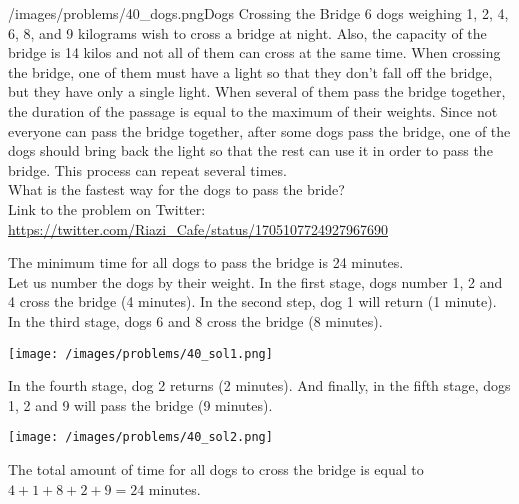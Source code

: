 \begin{problem}{/images/problems/40_dogs.png}{Dogs Crossing the Bridge}
	6 dogs weighing 1, 2, 4, 6, 8, and 9 kilograms wish to cross a bridge at night. Also, the capacity of the bridge is 14 kilos and not all of them can cross at the same time. When crossing the bridge, one of them must have a light so that they don't fall off the bridge, but they have only a single light. When several of them pass the bridge together, the duration of the passage is equal to the maximum of their weights. Since not everyone can pass the bridge together, after some  dogs pass the bridge, one of the dogs should bring back the light so that the rest can use it in order to pass the bridge. This process can repeat several times.\\[0.2cm]

What is the fastest way for the dogs to pass the bride?\\[0.2cm]

Link to the problem on Twitter:  \url{https://twitter.com/Riazi_Cafe/status/1705107724927967690}
\end{problem}
\begin{solution}
The minimum time  for all dogs to pass the bridge is 24 minutes.\\[0.2cm]

Let us number the dogs by their weight. In the first stage, dogs number 1, 2 and 4 cross the bridge (4 minutes). In the second step, dog 1 will return (1 minute). In the third stage, dogs 6 and 8 cross the bridge (8 minutes).
\begin{center}
	\texttt{[image: /images/problems/40\_sol1.png]}
\end{center}

In the fourth stage, dog 2 returns (2 minutes). And finally, in the fifth stage, dogs 1, 2 and 9 will pass the bridge (9 minutes).

\begin{center}
	\texttt{[image: /images/problems/40\_sol2.png]}
\end{center}

The total amount of time for all dogs to cross the bridge is equal to $4+1+8+2+9 = 24$ minutes.

\end{solution}